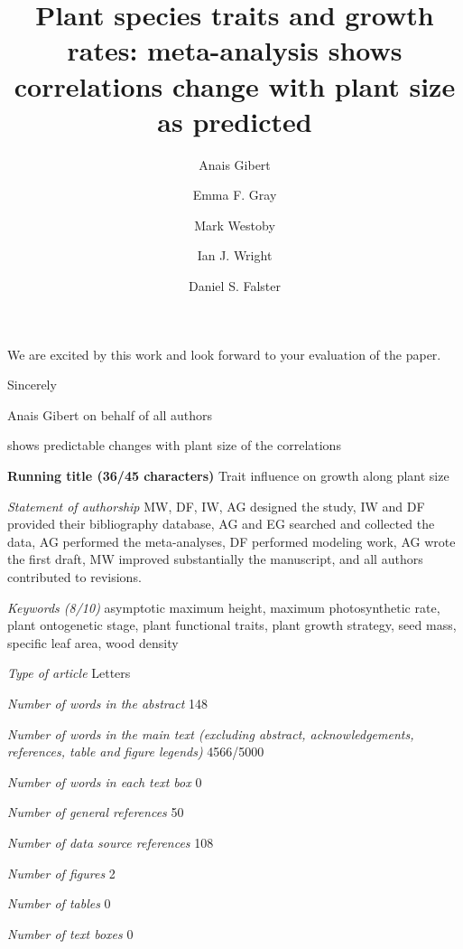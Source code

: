 \documentclass[a4paper]{article}\usepackage[]{graphicx}\usepackage[]{color}
\begin{document}
We are excited by this work and look forward to your evaluation of the paper.



Sincerely

Anais Gibert on behalf of all authors 


\newpage

\title{Plant species traits and growth rates: meta-analysis shows correlations change with plant size as predicted}

shows predictable changes with plant size of the correlations 

\author[1]{Anais Gibert}
\author[1]{Emma F. Gray}
\author[1]{Mark Westoby}
\author[1]{Ian J. Wright}
\author[1]{Daniel S. Falster}




\maketitle

\textbf{Running title (36/45 characters)} Trait influence on growth along plant size

\textit{Statement of authorship} MW, DF, IW, AG designed the study, IW and DF provided their bibliography database, AG and EG searched and collected the data, AG performed the meta-analyses, DF performed modeling work, AG wrote the first draft, MW improved substantially the manuscript, and all authors contributed to revisions.

\textit{Keywords (8/10)} asymptotic maximum height, maximum photosynthetic rate, plant ontogenetic stage, plant functional traits, plant growth strategy, seed mass, specific leaf area, wood density 

\textit{Type of article} Letters

\textit{Number of words in the abstract} 148

\textit{Number of words in the main text (excluding abstract, acknowledgements, references, table and figure legends)} 4566/5000

\textit{Number of words in each text box} 0

\textit{Number of general references} 50

\textit{Number of data source references} 108

\textit{Number of figures} 2

\textit{Number of tables} 0

\textit{Number of text boxes} 0
\end{document}
